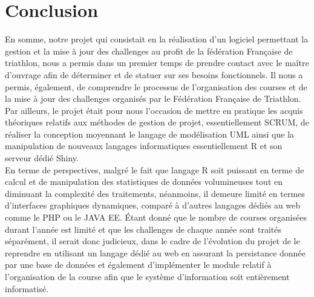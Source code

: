 \section* {Conclusion}
En somme, notre projet qui consistait en la réalisation d’un logiciel permettant  la gestion et la mise à jour des challenges au profit de la fédération Française de triathlon, nous a permis dans un premier temps de prendre contact avec le maître d’ouvrage afin de  déterminer et de statuer sur ses besoins fonctionnels. Il nous a permis, également,  de comprendre le processus de l’organisation des courses et de la mise à jour des challenges organisés par le Fédération Française de Triathlon. Par ailleurs, le projet était pour nous l’occasion de mettre en pratique les acquis théoriques relatifs aux méthodes de gestion de projet, essentiellement SCRUM, de réaliser la conception moyennant le langage de modélisation UML ainsi   que la manipulation de nouveaux langages informatiques essentiellement R et son serveur dédié Shiny.\\
En terme de perspectives, malgré le fait que langage R soit puissant en terme de calcul et de manipulation des statistiques de données volumineuses tout en diminuant la complexité des traitements,  néanmoins, il demeure limité en termes d’interfaces graphiques dynamiques, comparé à d’autres langages dédiés au web comme le PHP ou le JAVA EE. Étant donné que le nombre de courses organisées durant l’année est limité et que les challenges de chaque année sont traités séparément, il serait donc judicieux, dans le cadre de l’évolution du projet de le reprendre en utilisant un langage dédié au web en assurant la persistance donnée par une base de données et également d’implémenter le module relatif à l’organisation de la course afin que le système d’information soit entièrement informatisé. 
